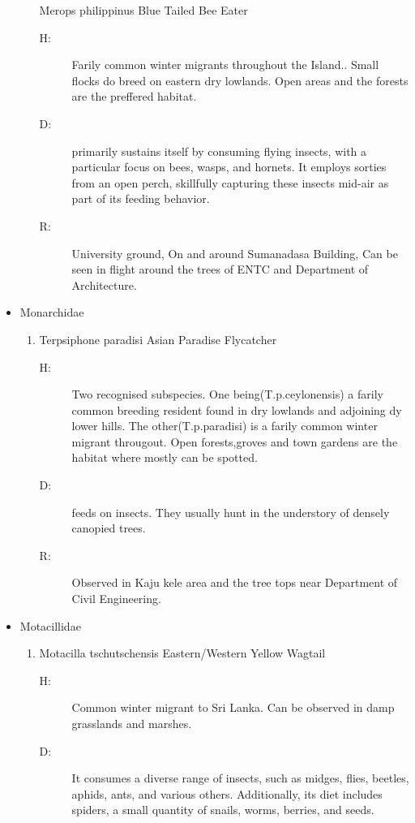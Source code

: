 \begin{itemize}
\begin{enumerate}
Merops philippinus\newline%
Blue Tailed Bee Eater%
\begin{description}%
\item[H: ]%
Farily common winter migrants throughout the Island.. Small flocks do breed on eastern dry lowlands. Open areas and the forests are the preffered habitat.%
\item[D: ]%
primarily sustains itself by consuming flying insects, with a particular focus on bees, wasps, and hornets. It employs sorties from an open perch, skillfully capturing these insects mid{-}air as part of its feeding behavior.%
\item[R: ]%
University ground, On and around Sumanadasa Building, Can be seen in flight around the trees of  ENTC and Department of Architecture.%
\end{description}%
\end{enumerate}%
\item%
Monarchidae%
\begin{enumerate}%
\item%
Terpsiphone paradisi\newline%
Asian Paradise Flycatcher%
\begin{description}%
\item[H: ]%
Two recognised subspecies. One being(T.p.ceylonensis) a farily common breeding resident found in dry lowlands and adjoining dy lower hills. The other(T.p.paradisi) is a farily common winter migrant througout. Open forests,groves and town gardens are the habitat where mostly can be spotted.%
\item[D: ]%
feeds on insects.  They usually hunt in the understory of densely canopied trees.%
\item[R: ]%
Observed in Kaju kele area and the tree tops near Department of Civil Engineering.%
\end{description}%
\end{enumerate}%
\item%
Motacillidae%
\begin{enumerate}%
\item%
Motacilla tschutschensis\newline%
Eastern/Western Yellow Wagtail%
\begin{description}%
\item[H: ]%
Common winter migrant to Sri Lanka. Can be observed in damp grasslands and marshes.%
\item[D: ]%
It consumes a diverse range of insects, such as midges, flies, beetles, aphids, ants, and various others. Additionally, its diet includes spiders, a small quantity of snails, worms, berries, and seeds.%

\end{description}
\end{enumerate}
\end{itemize}
